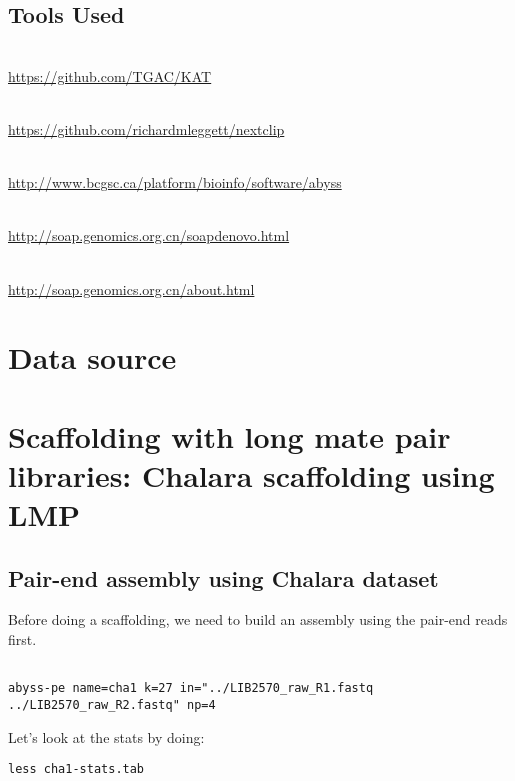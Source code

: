\subsection{Tools Used}
\begin{description}[style=multiline,labelindent=0cm,align=left,leftmargin=0.5cm]
  \item[Kmer Analysis Tool kit]\hfill\\
  	\url{https://github.com/TGAC/KAT}
  \item[Nextclip]\hfill\\
  	\url{https://github.com/richardmleggett/nextclip}
  \item[Abyss]\hfill\\
  	\url{http://www.bcgsc.ca/platform/bioinfo/software/abyss}
  \item[Soap Denovo]\hfill\\
  	\url{http://soap.genomics.org.cn/soapdenovo.html}
  \item[SOAPec]\hfill\\
  	\url{http://soap.genomics.org.cn/about.html}
\end{description}

\section{Data source}


\newpage

\section{Scaffolding with long mate pair libraries: Chalara scaffolding using LMP}
\subsection{Pair-end assembly using Chalara dataset}
Before doing a scaffolding, we need to build an assembly using the pair-end reads first.
\begin{steps}
\begin{lstlisting}

abyss-pe name=cha1 k=27 in="../LIB2570_raw_R1.fastq ../LIB2570_raw_R2.fastq" np=4

\end{lstlisting}
Let's look at the stats by doing:
\begin{lstlisting}
less cha1-stats.tab
\end{lstlisting}

\end{steps}

